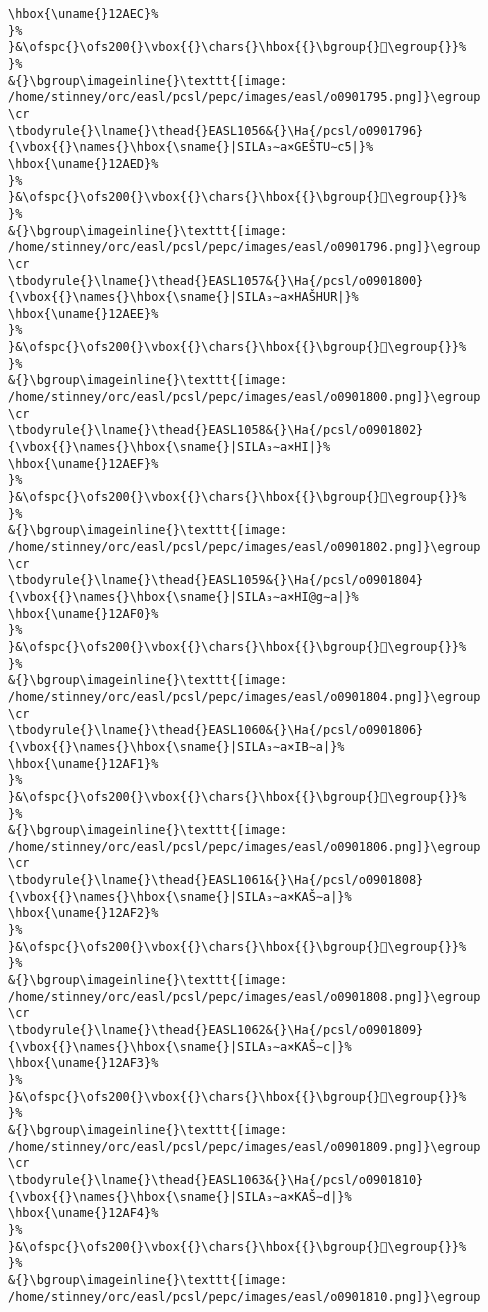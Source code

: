 \begin{verbatim}
\hbox{\uname{}12AEC}%
}%
}&\ofspc{}\ofs200{}\vbox{{}\chars{}\hbox{{}\bgroup{}𒫬\egroup{}}%
}%
&{}\bgroup\imageinline{}\texttt{[image: /home/stinney/orc/easl/pcsl/pepc/images/easl/o0901795.png]}\egroup
\cr
\tbodyrule{}\lname{}\thead{}EASL1056&{}\Ha{/pcsl/o0901796}{\vbox{{}\names{}\hbox{\sname{}|SILA₃∼a×GEŠTU∼c5|}%
\hbox{\uname{}12AED}%
}%
}&\ofspc{}\ofs200{}\vbox{{}\chars{}\hbox{{}\bgroup{}𒫭\egroup{}}%
}%
&{}\bgroup\imageinline{}\texttt{[image: /home/stinney/orc/easl/pcsl/pepc/images/easl/o0901796.png]}\egroup
\cr
\tbodyrule{}\lname{}\thead{}EASL1057&{}\Ha{/pcsl/o0901800}{\vbox{{}\names{}\hbox{\sname{}|SILA₃∼a×HAŠHUR|}%
\hbox{\uname{}12AEE}%
}%
}&\ofspc{}\ofs200{}\vbox{{}\chars{}\hbox{{}\bgroup{}𒫮\egroup{}}%
}%
&{}\bgroup\imageinline{}\texttt{[image: /home/stinney/orc/easl/pcsl/pepc/images/easl/o0901800.png]}\egroup
\cr
\tbodyrule{}\lname{}\thead{}EASL1058&{}\Ha{/pcsl/o0901802}{\vbox{{}\names{}\hbox{\sname{}|SILA₃∼a×HI|}%
\hbox{\uname{}12AEF}%
}%
}&\ofspc{}\ofs200{}\vbox{{}\chars{}\hbox{{}\bgroup{}𒫯\egroup{}}%
}%
&{}\bgroup\imageinline{}\texttt{[image: /home/stinney/orc/easl/pcsl/pepc/images/easl/o0901802.png]}\egroup
\cr
\tbodyrule{}\lname{}\thead{}EASL1059&{}\Ha{/pcsl/o0901804}{\vbox{{}\names{}\hbox{\sname{}|SILA₃∼a×HI@g∼a|}%
\hbox{\uname{}12AF0}%
}%
}&\ofspc{}\ofs200{}\vbox{{}\chars{}\hbox{{}\bgroup{}𒫰\egroup{}}%
}%
&{}\bgroup\imageinline{}\texttt{[image: /home/stinney/orc/easl/pcsl/pepc/images/easl/o0901804.png]}\egroup
\cr
\tbodyrule{}\lname{}\thead{}EASL1060&{}\Ha{/pcsl/o0901806}{\vbox{{}\names{}\hbox{\sname{}|SILA₃∼a×IB∼a|}%
\hbox{\uname{}12AF1}%
}%
}&\ofspc{}\ofs200{}\vbox{{}\chars{}\hbox{{}\bgroup{}𒫱\egroup{}}%
}%
&{}\bgroup\imageinline{}\texttt{[image: /home/stinney/orc/easl/pcsl/pepc/images/easl/o0901806.png]}\egroup
\cr
\tbodyrule{}\lname{}\thead{}EASL1061&{}\Ha{/pcsl/o0901808}{\vbox{{}\names{}\hbox{\sname{}|SILA₃∼a×KAŠ∼a|}%
\hbox{\uname{}12AF2}%
}%
}&\ofspc{}\ofs200{}\vbox{{}\chars{}\hbox{{}\bgroup{}𒫲\egroup{}}%
}%
&{}\bgroup\imageinline{}\texttt{[image: /home/stinney/orc/easl/pcsl/pepc/images/easl/o0901808.png]}\egroup
\cr
\tbodyrule{}\lname{}\thead{}EASL1062&{}\Ha{/pcsl/o0901809}{\vbox{{}\names{}\hbox{\sname{}|SILA₃∼a×KAŠ∼c|}%
\hbox{\uname{}12AF3}%
}%
}&\ofspc{}\ofs200{}\vbox{{}\chars{}\hbox{{}\bgroup{}𒫳\egroup{}}%
}%
&{}\bgroup\imageinline{}\texttt{[image: /home/stinney/orc/easl/pcsl/pepc/images/easl/o0901809.png]}\egroup
\cr
\tbodyrule{}\lname{}\thead{}EASL1063&{}\Ha{/pcsl/o0901810}{\vbox{{}\names{}\hbox{\sname{}|SILA₃∼a×KAŠ∼d|}%
\hbox{\uname{}12AF4}%
}%
}&\ofspc{}\ofs200{}\vbox{{}\chars{}\hbox{{}\bgroup{}𒫴\egroup{}}%
}%
&{}\bgroup\imageinline{}\texttt{[image: /home/stinney/orc/easl/pcsl/pepc/images/easl/o0901810.png]}\egroup

\end{verbatim}
